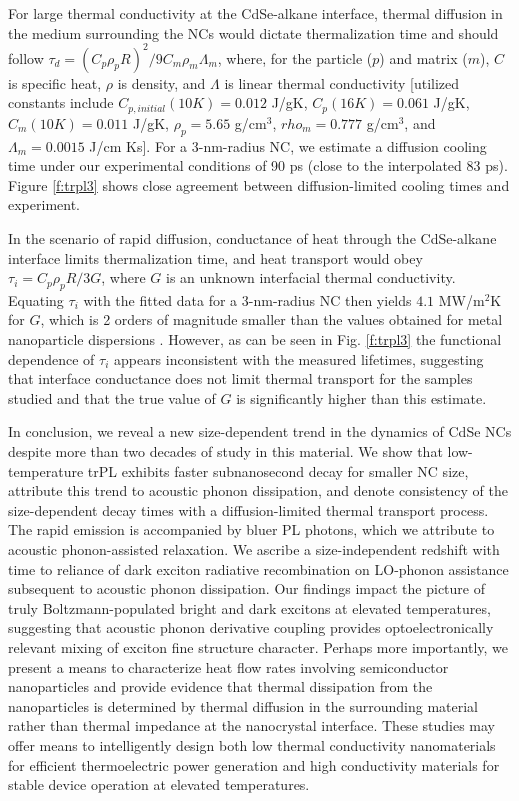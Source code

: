 For large thermal conductivity at the CdSe-alkane interface, thermal diffusion in the medium surrounding the NCs would dictate thermalization time and should follow $\tau_d = \left(C_p\rho_pR\right)^2/9C_m\rho_m\Lambda_m$, where, for the particle ($p$) and matrix ($m$), $C$ is specific heat, $\rho$ is density, and $\Lambda$ is linear thermal conductivity [utilized constants include $C_{p, initial}\left(10 K\right) = 0.012$ J/gK, $C_p\left(16 K\right) = 0.061$ J/gK, $C_m\left(10 K\right) = 0.011$ J/gK, $\rho_p = 5.65$ g/cm$^3$, $rho_m = 0.777$ g/cm$^3$, and $\Lambda_m = 0.0015$ J/cm Ks].  For a 3-nm-radius NC, we estimate a diffusion cooling time under our experimental conditions of 90 ps (close to the interpolated 83 ps).  Figure \ref{f:trpl3} shows close agreement between diffusion-limited cooling times and experiment. \par

In the scenario of rapid diffusion, conductance of heat through the CdSe-alkane interface limits thermalization time, and heat transport would obey $\tau_i = C_p\rho_pR/3G$, where $G$ is an unknown interfacial thermal conductivity.  Equating $\tau_i$ with the fitted data for a 3-nm-radius NC then yields $4.1$ MW/m$^2$K for $G$, which is 2 orders of magnitude smaller than the values obtained for metal nanoparticle dispersions \cite{doi:10.1021/jp020581+, PhysRevB.66.224301, doi:10.1021/jp048375k}.  However, as can be seen in Fig. \ref{f:trpl3} the functional dependence of $\tau_i$ appears inconsistent with the measured lifetimes, suggesting that interface conductance does not limit thermal transport for the samples studied and that the true value of $G$ is significantly higher than this estimate. \par

In conclusion, we reveal a new size-dependent trend in the dynamics of CdSe NCs despite more than two decades of study in this material. We show that low-temperature trPL exhibits faster subnanosecond decay for smaller NC size, attribute this trend to acoustic phonon dissipation, and denote consistency of the size-dependent decay times with a diffusion-limited thermal transport process. The rapid emission is accompanied by bluer PL photons, which we attribute to acoustic phonon-assisted relaxation. We ascribe a size-independent redshift with time to reliance of dark exciton radiative recombination on LO-phonon assistance subsequent to acoustic phonon dissipation. Our findings impact the picture of truly Boltzmann-populated bright and dark excitons at elevated temperatures, suggesting that acoustic phonon derivative coupling provides optoelectronically relevant mixing of exciton fine structure character. Perhaps more importantly, we present a means to characterize heat flow rates involving semiconductor nanoparticles and provide evidence that thermal dissipation from the nanoparticles is determined by thermal diffusion in the surrounding material rather than thermal impedance at the nanocrystal interface. These studies may offer means to intelligently design both low thermal conductivity nanomaterials for efficient thermoelectric power generation and high conductivity materials for stable device operation at elevated temperatures.

